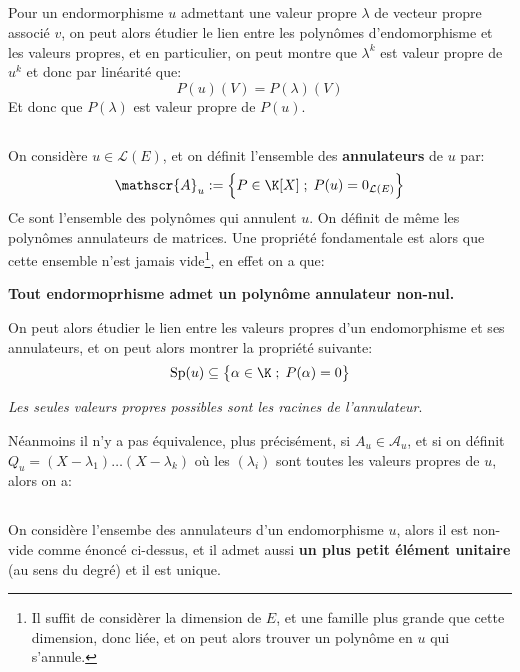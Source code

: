 \subsection*{}
Pour un endormorphisme \(u\) admettant une valeur propre \(\lambda\) de vecteur propre associé \(v\), on peut alors étudier le lien entre les polynômes d'endomorphisme et les valeurs propres, et en particulier, on peut montre que \(\lambda^k\) est valeur propre de \(u^k\) et donc par linéarité que:
\[
   P(u)(V) = P(\lambda)(V)
\]
Et donc que \(P(\lambda)\) est valeur propre de \(P(u)\).
\subsection*{}
On considère \(u \in \mathcal{L}(E)\), et on définit l'ensemble des \textbf{annulateurs} de \(u\) par:
\[
   \mathscr{A}_u := \Bigl\{ P \in \K[X] \; ; \; P(u) = 0_{\mathcal{L}(E)} \Bigl\}   
\]
Ce sont l'ensemble des polynômes qui annulent \(u\). On définit de même les polynômes annulateurs de matrices. Une propriété fondamentale est alors que cette ensemble n'est jamais vide\footnote[1]{Il suffit de considèrer la dimension de \(E\), et une famille plus grande que cette dimension, donc liée, et on peut alors trouver un polynôme en \(u\) qui s'annule.}, en effet on a que:
\begin{center}
   \textbf{Tout endormoprhisme admet un polynôme annulateur non-nul.}
\end{center}
On peut alors étudier le lien entre les valeurs propres d'un endomorphisme et ses annulateurs, et on peut alors montrer la propriété suivante:
\[
   \text{Sp}(u) \subseteq \bigl\{ \alpha \in \K \; ; \; P(\alpha) = 0 \bigl\}   
\]
\begin{center}
   \textit{Les seules valeurs propres possibles sont les racines de l'annulateur}.
\end{center}
\pagebreak
Néanmoins il n'y a pas équivalence, plus précisément, si \(A_u \in \mathscr{A}_u\), et si on définit \(Q_u = (X - \lambda_1)\ldots(X - \lambda_k)\) où les \((\lambda_i)\) sont toutes les valeurs propres de \(u\), alors on a:
\subsection*{}
On considère l'ensembe des annulateurs d'un endomorphisme \(u\), alors il est non-vide comme énoncé ci-dessus, et il admet aussi \textbf{un plus petit élément unitaire} (au sens du degré) et il est unique.\<

